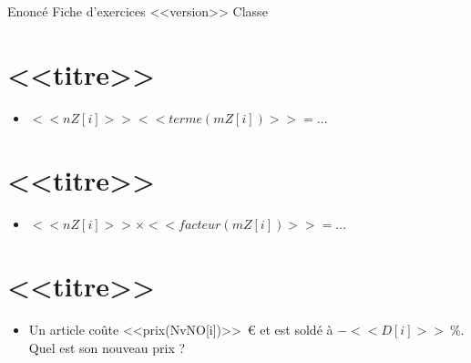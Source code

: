 {Enoncé} \hfill {\huge Fiche d'exercices \no <<version>>} \hfill {Classe}

\section{<<titre>>}
\begin{itemize}

  \item $<<nZ[i]>> <<terme(mZ[i])>>=\ldots$
\end{itemize}



\section{<<titre>>}
\begin{itemize}

  \item $<<nZ[i]>>\times<<facteur(mZ[i])>>=\ldots$
\end{itemize}


\section{<<titre>>}
\begin{itemize}

  \item Un article coûte <<prix(NvNO[i])>>~€ et est soldé à $-<<D[i]>>~\%$. Quel est son nouveau prix ?
\end{itemize}
